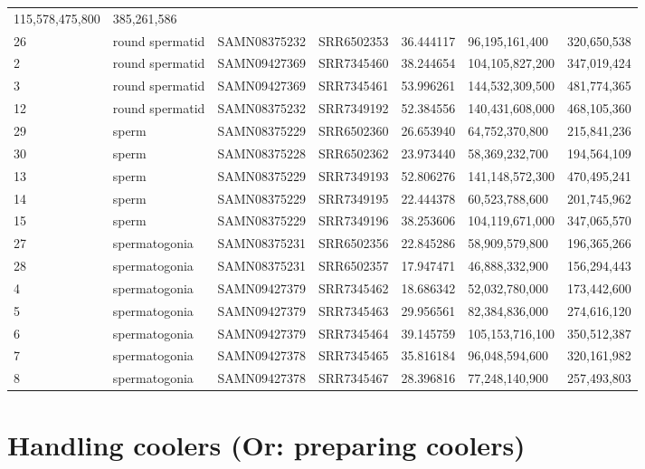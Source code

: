 \documentclass[
  a4paper,
]{scrbook}
\begin{document}
\begin{longtable}[]{@{}lllllll@{}}
115,578,475,800 & 385,261,586 \\
26 & round spermatid & SAMN08375232 & SRR6502353 & 36.444117 &
96,195,161,400 & 320,650,538 \\
2 & round spermatid & SAMN09427369 & SRR7345460 & 38.244654 &
104,105,827,200 & 347,019,424 \\
3 & round spermatid & SAMN09427369 & SRR7345461 & 53.996261 &
144,532,309,500 & 481,774,365 \\
12 & round spermatid & SAMN08375232 & SRR7349192 & 52.384556 &
140,431,608,000 & 468,105,360 \\
29 & sperm & SAMN08375229 & SRR6502360 & 26.653940 & 64,752,370,800 &
215,841,236 \\
30 & sperm & SAMN08375228 & SRR6502362 & 23.973440 & 58,369,232,700 &
194,564,109 \\
13 & sperm & SAMN08375229 & SRR7349193 & 52.806276 & 141,148,572,300 &
470,495,241 \\
14 & sperm & SAMN08375229 & SRR7349195 & 22.444378 & 60,523,788,600 &
201,745,962 \\
15 & sperm & SAMN08375229 & SRR7349196 & 38.253606 & 104,119,671,000 &
347,065,570 \\
27 & spermatogonia & SAMN08375231 & SRR6502356 & 22.845286 &
58,909,579,800 & 196,365,266 \\
28 & spermatogonia & SAMN08375231 & SRR6502357 & 17.947471 &
46,888,332,900 & 156,294,443 \\
4 & spermatogonia & SAMN09427379 & SRR7345462 & 18.686342 &
52,032,780,000 & 173,442,600 \\
5 & spermatogonia & SAMN09427379 & SRR7345463 & 29.956561 &
82,384,836,000 & 274,616,120 \\
6 & spermatogonia & SAMN09427379 & SRR7345464 & 39.145759 &
105,153,716,100 & 350,512,387 \\
7 & spermatogonia & SAMN09427378 & SRR7345465 & 35.816184 &
96,048,594,600 & 320,161,982 \\
8 & spermatogonia & SAMN09427378 & SRR7345467 & 28.396816 &
77,248,140,900 & 257,493,803 \\

\end{longtable}

\section{Handling coolers (Or: preparing
coolers)}\label{handling-coolers-or-preparing-coolers}
\end{document}
